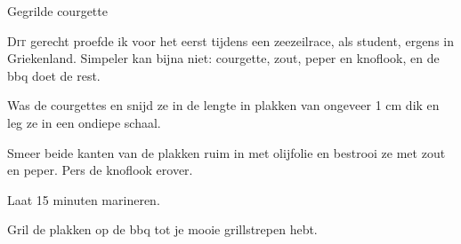 \begin{recipe}{Gegrilde courgette}
\label{recipe:gegrilde-courgette}


\lettrine{D}{it} gerecht proefde ik voor het eerst tijdens een zeezeilrace,
als student, ergens in Griekenland. Simpeler kan bijna niet: courgette,
zout, peper en knoflook, en de bbq doet de rest.

\begin{ingredients}
\end{ingredients}

\begin{steps}
  \item Was de courgettes en snijd ze in de lengte in plakken van ongeveer 1 cm dik en
        leg ze in een ondiepe schaal.
  \item Smeer beide kanten van de plakken ruim in met olijfolie en
        bestrooi ze met zout en peper. Pers de knoflook erover.
  \item Laat 15 minuten marineren.
  \item Gril de plakken op de bbq tot je mooie grillstrepen hebt.
\end{steps}

\end{recipe}
